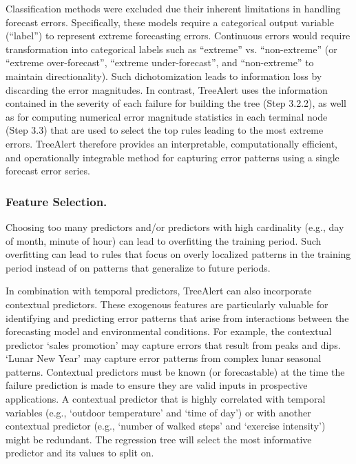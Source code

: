 \documentclass[ijds,sglanonrev]{informs4}
\begin{document}
Classification methods were excluded due their inherent limitations in handling forecast errors. Specifically, these models require a categorical output variable (“label”) to represent extreme forecasting errors. Continuous errors would require transformation into categorical labels such as “extreme” vs. “non-extreme” (or “extreme over-forecast”, “extreme under-forecast”, and “non-extreme” to maintain directionality). Such dichotomization leads to information loss by discarding the error magnitudes. In contrast, TreeAlert uses the information contained in the severity of each failure for building the tree (Step 3.2.2), as well as for computing numerical error magnitude statistics in each terminal node (Step 3.3) that are used to select the top rules leading to the most extreme errors. TreeAlert therefore provides an interpretable, computationally efficient, and operationally integrable method for capturing error patterns using a single forecast error series.

\subsubsection{Feature Selection.}
Choosing too many predictors and/or predictors with high cardinality (e.g., day of month, minute of hour) can lead to overfitting the training period. Such overfitting can lead to rules that focus on overly localized patterns in the training period instead of on patterns that generalize to future periods. 

In combination with temporal predictors, TreeAlert can also incorporate contextual predictors. These exogenous features are particularly valuable for identifying and predicting error patterns that arise from interactions between the forecasting model and environmental conditions. For example, the contextual predictor ‘sales promotion’ may capture errors that result from peaks and dips. `Lunar New Year' may capture error patterns from complex lunar seasonal patterns. Contextual predictors must be known (or forecastable) at the time the failure prediction is made to ensure they are valid inputs in prospective applications. A contextual predictor that is highly correlated with temporal variables (e.g., `outdoor temperature' and `time of day') or with another contextual predictor (e.g., `number of walked steps' and `exercise intensity') might be redundant. The regression tree will select the most informative predictor and its values to split on.
\end{document}
